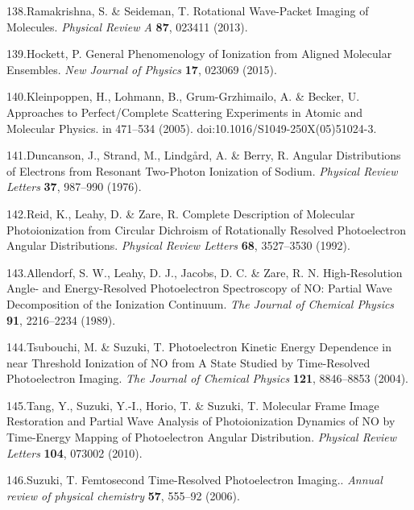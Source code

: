 \documentclass[10pt]{article}
\begin{document}
\label{csl:138}138.Ramakrishna, S. \& Seideman, T. {Rotational Wave-Packet Imaging of Molecules}. \textit{Physical Review A} \textbf{87}, 023411 (2013).

\label{csl:139}139.Hockett, P. {General Phenomenology of Ionization from Aligned Molecular Ensembles}. \textit{New Journal of Physics} \textbf{17}, 023069 (2015).

\label{csl:140}140.Kleinpoppen, H., Lohmann, B., {Grum-Grzhimailo}, A. \& Becker, U. {Approaches to {{Perfect}}/{{Complete Scattering Experiments}} in {{Atomic}} and {{Molecular Physics}}}. in 471–534 (2005). doi:10.1016/S1049-250X(05)51024-3.

\label{csl:141}141.Duncanson, J., Strand, M., Lindg{\aa}rd, A. \& Berry, R. {Angular {{Distributions}} of {{Electrons}} from {{Resonant Two}}-{{Photon Ionization}} of {{Sodium}}}. \textit{Physical Review Letters} \textbf{37}, 987–990 (1976).

\label{csl:142}142.Reid, K., Leahy, D. \& Zare, R. {Complete Description of Molecular Photoionization from Circular Dichroism of Rotationally Resolved Photoelectron Angular Distributions}. \textit{Physical Review Letters} \textbf{68}, 3527–3530 (1992).

\label{csl:143}143.Allendorf, S. W., Leahy, D. J., Jacobs, D. C. \& Zare, R. N. {High-Resolution Angle- and Energy-Resolved Photoelectron Spectroscopy of {{NO}}: {{Partial}} Wave Decomposition of the Ionization Continuum}. \textit{The Journal of Chemical Physics} \textbf{91}, 2216–2234 (1989).

\label{csl:144}144.Tsubouchi, M. \& Suzuki, T. {Photoelectron Kinetic Energy Dependence in near Threshold Ionization of {{NO}} from {{A}} State Studied by Time-Resolved Photoelectron Imaging}. \textit{The Journal of Chemical Physics} \textbf{121}, 8846–8853 (2004).

\label{csl:145}145.Tang, Y., Suzuki, Y.-I., Horio, T. \& Suzuki, T. {Molecular {{Frame Image Restoration}} and {{Partial Wave Analysis}} of {{Photoionization Dynamics}} of {{NO}} by {{Time}}-{{Energy Mapping}} of {{Photoelectron Angular Distribution}}}. \textit{Physical Review Letters} \textbf{104}, 073002 (2010).

\label{csl:146}146.Suzuki, T. {Femtosecond Time-Resolved Photoelectron Imaging.}. \textit{Annual review of physical chemistry} \textbf{57}, 555–92 (2006).
\end{document}
